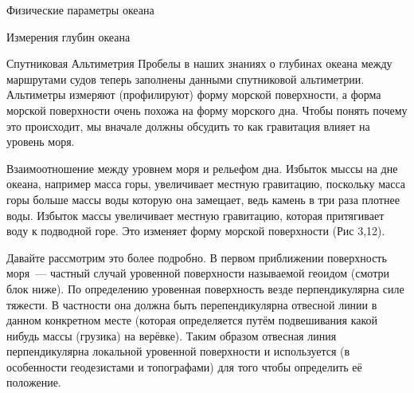 \begin{chapter}{Физические параметры океана}
\begin{section}{Измерения глубин океана}
\begin{subsection}{Спутниковая Альтиметрия}
Пробелы в наших знаниях о глубинах океана между маршрутами судов
теперь заполнены данными спутниковой альтиметрии. Альтиметры измеряют
(профилируют) форму морской поверхности, а форма морской поверхности
очень похожа на форму морского дна. Чтобы понять почему это
происходит, мы вначале должны обсудить то как гравитация влияет на
уровень моря.
%

Взаимоотношение между уровнем моря и рельефом дна.
Избыток мыссы на дне океана, например масса горы, увеличивает местную
гравитацию, поскольку масса горы больше массы воды которую она
замещает, ведь камень в три раза плотнее воды. Избыток массы
увеличивает местную гравитацию, которая притягивает воду к подводной
горе. Это изменяет форму морской поверхности (Рис 3,12).
%

Давайте рассмотрим это более подробно. В первом приближении
поверхность моря~--- частный случай уровенной поверхности называемой
геоидом (смотри блок ниже). По определению уровенная поверхность везде
перпендикулярна силе тяжести. В частности она должна быть
перепендикулярна отвесной линии в данном конкретном месте (которая
определяется путём подвешивания какой нибудь массы (грузика) на
верёвке). Таким образом отвесная линия перпендикулярна локальной
уровенной поверхности и используется (в особенности геодезистами и
топографами) для того чтобы определить её положение.
%


\end{subsection}
\end{section}
\end{chapter}
